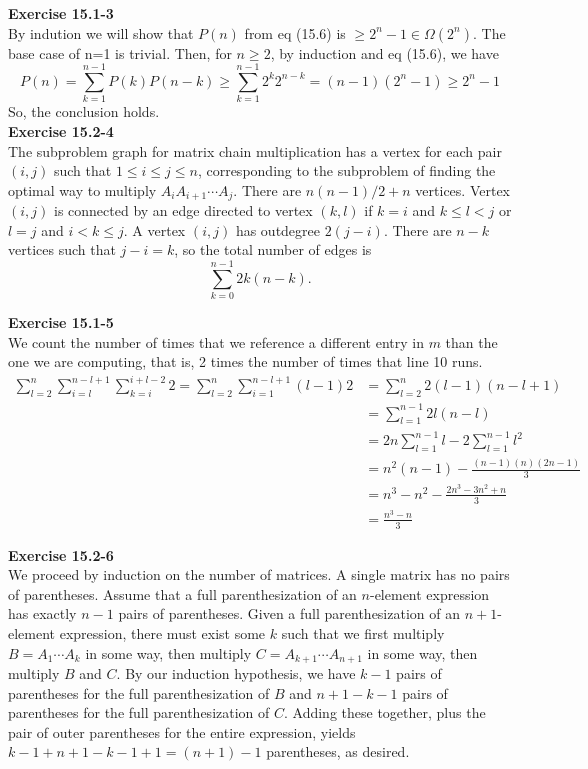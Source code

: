 \documentclass{article}
\begin{document}
\noindent\textbf{Exercise 15.1-3}\\

By indution we will show that $P(n)$ from eq (15.6) is $\ge 2^{n} -1\in \Omega(2^n)$. The base case of n=1 is trivial. Then, for $n\ge 2$, by induction and eq (15.6), we have
\[
P(n) = \sum_{k=1}^{n-1} P(k) P(n-k) \ge \sum_{k=1}^{n-1} 2^{k} 2^{n-k} = (n-1) (2^{n} -1) \ge 2^n -1 
\]
So, the conclusion holds.\\

\noindent\textbf{Exercise 15.2-4}\\

The subproblem graph for matrix chain multiplication has a vertex for each pair $(i,j)$ such that $1\leq i \leq j \leq n$, corresponding to the subproblem of finding the optimal way to multiply $A_iA_{i+1}\cdots A_j$.  There are $n(n-1)/2 + n$ vertices.  Vertex $(i,j)$ is connected by an edge directed to vertex $(k,l)$ if $k=i$ and $k \leq l < j$ or $l = j$ and $i < k \leq j$.  A vertex $(i,j)$ has outdegree $2(j-i)$.  There are $n-k$ vertices such that $j-i = k$, so the total number of edges is
\[ \sum_{k=0}^{n-1} 2k(n-k).\]

\noindent\textbf{Exercise 15.1-5}\\

We count the number of times that we reference a different entry in $m$ than the one we are computing, that is, 2 times the number of times that line 10 runs.
\begin{align*}
 \sum_{l=2}^n \sum_{i=l}^{n-l+1} \sum_{k=i}^{i+l-2} 2 =  \sum_{l=2}^n \sum_{i=1}^{n-l+1} (l-1)2 &= \sum_{l=2}^n 2(l-1)(n-l+1) \\
 &= \sum_{l=1}^{n-1} 2l(n-l)\\
 &= 2n \sum_{l=1}^{n-1} l - 2 \sum_{l=1}^{n-1} l^2\\
 &= n^2(n-1) - \frac{(n-1)(n)(2n-1)}{3}\\
 &= n^3 -n^2 - \frac{2n^3-3n^2+n}{3}\\
 &= \frac{n^3-n}{3}
\end{align*}

\noindent\textbf{Exercise 15.2-6}\\

We proceed by induction on the number of matrices. A single matrix has no pairs of parentheses.  Assume that a full parenthesization of an $n$-element expression has exactly $n-1$ pairs of parentheses.  Given a full parenthesization of an $n+1$-element expression, there must exist some $k$ such that we first multiply $B= A_1 \cdots A_k$ in some way, then multiply $C = A_{k+1} \cdots A_{n+1}$ in some way, then multiply $B$ and $C$.  By our induction hypothesis, we have $k-1$ pairs of parentheses for the full parenthesization of $B$ and $n+1-k - 1$ pairs of parentheses for the full parenthesization of $C$.  Adding these together, plus the pair of outer parentheses for the entire expression, yields $k-1+n + 1-k-1+1 = (n+1) - 1$ parentheses, as desired.  \\
\end{document}
